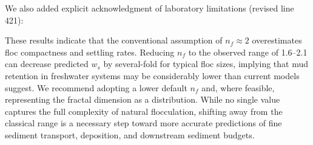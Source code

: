 \documentclass[11pt]{article}
\newenvironment{Snippet}{%
  \par\vspace{0.3em}\begin{list}{}{\setlength{\leftmargin}{1em}\setlength{\rightmargin}{0.5em}}\item\small\itshape
}{%
  \end{list}\vspace{0.3em}
}
\begin{document}
\begin{enumerate}[label=\textbf{R1.\arabic*.}]
\begin{Snippet}
\end{Snippet}
We also added explicit acknowledgment of laboratory limitations (revised line 421):
\begin{Snippet}
These results indicate that the conventional assumption of $n_f \approx 2$ overestimates floc compactness and settling rates. Reducing $n_f$ to the observed range of 1.6--2.1 can decrease predicted $w_s$ by several-fold for typical floc sizes, implying that mud retention in freshwater systems may be considerably lower than current models suggest. We recommend adopting a lower default $n_f$ and, where feasible, representing the fractal dimension as a distribution. While no single value captures the full complexity of natural flocculation, shifting away from the classical range is a necessary step toward more accurate predictions of fine sediment transport, deposition, and downstream sediment budgets.
\end{Snippet}

\end{enumerate}
\end{document}
